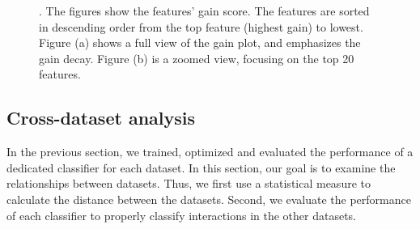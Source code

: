 \documentclass{bmcart}
\begin{document}
\begin{figure}[h!]
    \centering
    \qquad
    \caption{. The figures show the features' gain score. The features are sorted in descending order from the top feature (highest gain) to lowest. Figure (a) shows a full view of the gain plot, and emphasizes the gain decay.  Figure (b) is a zoomed view, focusing on the top 20 features.}%
    \label{fig:feature_importance}%
\end{figure}

\subsection*{Cross-dataset analysis}
In the previous section, we trained, optimized and evaluated the performance of a dedicated classifier for each dataset. In this section, our goal is to examine the relationships between datasets. Thus, we first use a statistical measure to calculate the distance between the datasets. Second, we evaluate the performance of each classifier to properly classify interactions in the other datasets.
\end{document}

